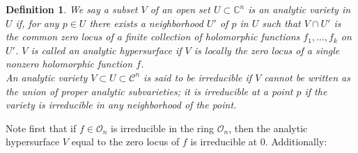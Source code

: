 \documentclass{article}
\newtheorem{defn}{Definition}
\begin{document}
\begin{defn}

	We say a subset $V$ of an open set $U \subset \mathbb{C}^n$ is an \textit{analytic variety} in $U$ if, for any $p \in U$ there exists a neighborhood $U'$ of $p$ in $U$ such that $V \cap U'$ is the common zero locus of a finite collection of holomorphic functions $f_1, \ldots, f_k$ on $U'$. $V$ is called an analytic hypersurface if $V$ is locally the zero locus of a single nonzero holomorphic function $f$.\\
\indent An analytic variety $V \subset U \subset \mathcal{ C }^n$ is said to be \textit{irreducible} if $V$ cannot be written as the union of proper analytic subvarieties; it is irreducible at a point $p$ if the variety is irreducible in any neighborhood of the point. 

\end{defn}

Note first that if $f \in \mathcal{O}_n$ is irreducible in the ring $ \mathcal{O}_n$, then the analytic hypersurface $V$ equal to the zero locus of $f$ is irreducible at 0. Additionally:
\end{document}
